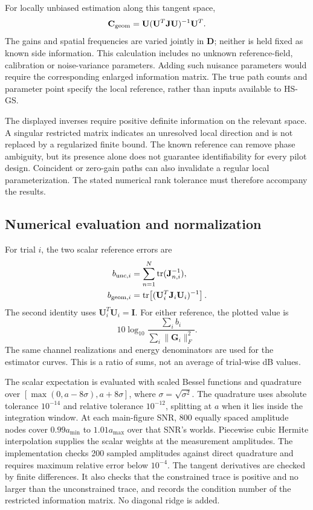 For locally unbiased estimation along this tangent space,
\begin{equation}
\mathbf C_{\rm geom}
=\mathbf U(\mathbf U^T\mathbf J\mathbf U)^{-1}\mathbf U^T.
\end{equation}
The gains and spatial frequencies are varied jointly in $\mathbf D$;
neither is held fixed as known side information. This calculation includes
no unknown reference-field, calibration or noise-variance parameters.
Adding such nuisance parameters would require the corresponding enlarged
information matrix. The true path counts and parameter point specify the
local reference, rather than inputs available to HS-GS.

The displayed inverses require positive definite information on the
relevant space. A singular restricted matrix indicates an unresolved
local direction and is not replaced by a regularized finite bound.
The known reference can remove phase ambiguity, but its presence alone
does not guarantee identifiability for every pilot design. Coincident or
zero-gain paths can also invalidate a regular local parameterization.
The stated numerical rank tolerance must therefore accompany the results.

\subsection{Numerical evaluation and normalization}

For trial $i$, the two scalar reference errors are
\begin{align}
b_{{\rm unc},i}&=\sum_{n=1}^{N}\operatorname{tr}(\mathbf J_{n,i}^{-1}),\\
b_{{\rm geom},i}&=
 \operatorname{tr}\!\left[(\mathbf U_i^T\mathbf J_i\mathbf U_i)^{-1}\right].
\end{align}
The second identity uses $\mathbf U_i^T\mathbf U_i=\mathbf I$.
For either reference, the plotted value is
\begin{equation}
10\log_{10}
 \frac{\sum_i b_i}{\sum_i\|\mathbf G_i\|_F^2}.
\label{eq:revision-bound-normalization}
\end{equation}
The same channel realizations and energy denominators are used for the
estimator curves. This is a ratio of sums, not an average of trial-wise
dB values.

The scalar expectation is evaluated with scaled Bessel functions and
quadrature over $[\max(0,a-8\sigma),a+8\sigma]$, where
$\sigma=\sqrt{\sigma^2}$. The quadrature uses absolute tolerance
$10^{-14}$ and relative tolerance $10^{-12}$, splitting at $a$ when it
lies inside the integration window. At each main-figure SNR, 800 equally
spaced amplitude nodes cover $0.99a_{\min}$ to $1.01a_{\max}$ over that
SNR's worlds. Piecewise cubic Hermite interpolation supplies the scalar
weights at the measurement amplitudes. The implementation checks 200
sampled amplitudes against direct quadrature and requires maximum relative
error below $10^{-4}$. The tangent derivatives are checked by finite
differences. It also checks that the constrained trace is positive and
no larger than the unconstrained trace, and records the condition number
of the restricted information matrix. No diagonal ridge is added.

